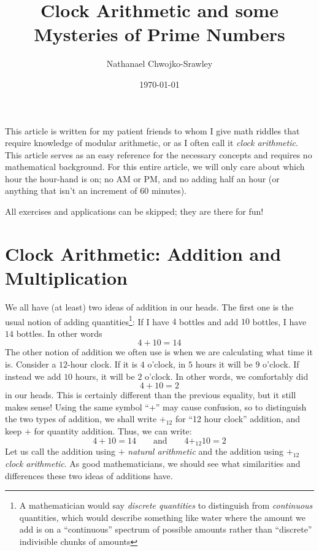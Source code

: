 \documentclass{article}
\title{Clock Arithmetic and some Mysteries of Prime Numbers}
\author{Nathanael Chwojko-Srawley}
\date{\today}
\renewcommand{\maketitle}{
    \quad
    \vspace{1em}
  \begin{center}
      \LARGE\bfseries \thetitle \par
      \vspace{0.6em}
      \large
  \end{center}
    \vspace{1em}
}
\newcommand{\qn}{\quad\newline}
\begin{document}
\maketitle

\vspace{2em}
This article is written for my patient friends to whom I give math riddles that require knowledge of modular
arithmetic, or as I often call it \emph{clock arithmetic}. This article serves as an easy reference for the
necessary concepts and requires no mathematical background. For this entire article, we will only care about
which hour the hour-hand is on; no AM or PM, and no adding half an hour (or anything that isn't an increment
of 60 minutes).

\qn
All exercises and applications can be skipped; they are there for fun!
\vspace{2em}

\section{Clock Arithmetic: Addition and Multiplication}


We all have (at least) two ideas of addition in our heads. The first one is the usual notion of adding
quantities\footnote{A mathematician would say \emph{discrete quantities} to distinguish from
  \emph{continuous} quantities, which would describe something like water where the amount we add is on a
``continuous'' spectrum of possible amounts rather than ``discrete'' indivisible chunks of amounts}: If I have
$4$ bottles and add $10$ bottles, I have $14$ bottles. In other words
\[
  4+10 = 14
\]
The other notion of addition we often use is when we are calculating what time it is. Consider a
$12$-hour clock. If it is $4$ o'clock, in $5$ hours it will be $9$ o'clock. If instead we add $10$ hours, it
will be $2$ o'clock. In other words, we comfortably did
\[
  4+10 = 2
\]
in our heads. This is certainly different than the previous equality, but it still makes sense! Using the same symbol ``$+$''
may cause confusion, so to distinguish the two types of addition, we shall write $+_{12}$ for ``12 hour
clock'' addition, and keep $+$ for quantity addition. Thus, we can write:
\[
  4+10 = 14 \qquad \text{and} \qquad 4+_{12}10 = 2
\]
Let us call the addition using $+$ \emph{natural arithmetic} and the addition using $+_{12}$
\emph{clock arithmetic}. As good mathematicians, we should see what similarities and differences these
two ideas of additions have.
\end{document}
